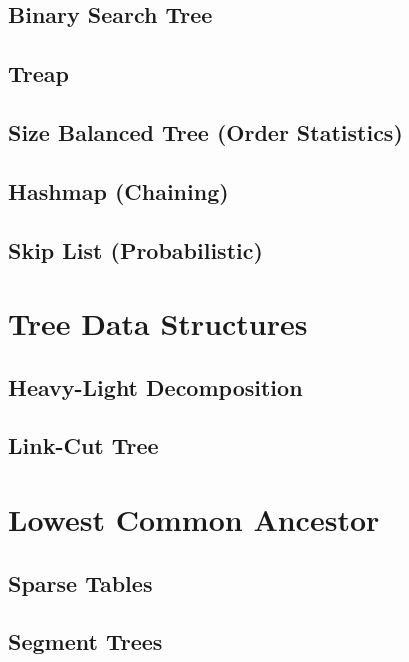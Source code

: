 \subsection{Binary Search Tree}

\subsection{Treap}

\subsection{Size Balanced Tree (Order Statistics)}

\subsection{Hashmap (Chaining)}

\subsection{Skip List (Probabilistic)}


\section{Tree Data Structures}
\setcounter{section}{6}
\setcounter{subsection}{0}
\subsection{Heavy-Light Decomposition}

\subsection{Link-Cut Tree}


\section{Lowest Common Ancestor}
\setcounter{section}{7}
\setcounter{subsection}{0}
\subsection{Sparse Tables}

\subsection{Segment Trees}

